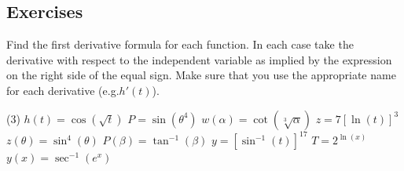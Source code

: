 \documentclass[12pt,]{book}
\theoremstyle{plain}
\theoremstyle{definition}
\numberwithin{equation}{section}
\newcounter{figstack}
\newcounter{figindex}
\newlength\fight
\newcommand\pushValignCaptionBottom[5][b]{%
\stepcounter{figstack}%
\expandafter\def\csname %
figalign\romannumeral\value{figstack}\endcsname{#1}%
\expandafter\def\csname %
figtype\romannumeral\value{figstack}\endcsname{#2}%
\expandafter\def\csname %
figwd\romannumeral\value{figstack}\endcsname{#3}%
\expandafter\def\csname %
figcontent\romannumeral\value{figstack}\endcsname{#4}%
\expandafter\def\csname %
figcap\romannumeral\value{figstack}\endcsname{#5}%
\setbox0=\hbox{%
\begin{#2}{#3}#4\end{#2}}%
\ifdim\dimexpr\ht0+\dp0\relax>\fight\global\setlength{\fight}{%
\dimexpr\ht0+\dp0\relax}\fi%
}
\newcommand\popValignCaptionBottom{%
\setcounter{figindex}{0}%
\hfill%
\whiledo{\value{figindex}<\value{figstack}}{%
\stepcounter{figindex}%
\def\tmp{\csname figwd\romannumeral\value{figindex}\endcsname}%
\begin{\csname figtype\romannumeral\value{figindex}\endcsname}[t]{\tmp}%
\centering%
\stackinset{c}{}%
{\csname figalign\romannumeral\value{figindex}\endcsname}{}%
{\csname figcontent\romannumeral\value{figindex}\endcsname}%
{\rule{0pt}{\fight}}\par%
\csname figcap\romannumeral\value{figindex}\endcsname%
\end{\csname figtype\romannumeral\value{figindex}\endcsname}%
\hfill%
}%
\setcounter{figstack}{0}%
\setlength{\fight}{0pt}%
\hfill%
}
\newcommand{\fe}[2]{#1\mathopen{}\left(#2\right)\mathclose{}}
\newcommand{\fd}[1]{#1'}
\begin{document}
\subsection[Exercises]{Exercises}\label{exercises-43}
\hypertarget{exercisegroup-92}{\null}Find the first derivative formula for each function.  In each case take the derivative with respect to the independent variable as implied by the expression on the right side of the equal sign.  Make sure that you use the appropriate name for each derivative (e.g.\@ \(\fe{\fd{h}}{t}\)).%
\par
\begin{exercisegroup}(3)
\exercise[1.]\hypertarget{exercise-441}{\null}\(\fe{h}{t}=\fe{\cos}{\sqrt{t}}\)%
\exercise[2.]\hypertarget{exercise-442}{\null}\(P=\fe{\sin}{\theta^4}\)%
\exercise[3.]\hypertarget{exercise-443}{\null}\(\fe{w}{\alpha}=\fe{\cot}{\sqrt[3]{\alpha}}\)%
\exercise[4.]\hypertarget{exercise-444}{\null}\(z=7\left[\fe{\ln}{t}\right]^3\)%
\exercise[5.]\hypertarget{exercise-445}{\null}\(\fe{z}{\theta}=\fe{\sin^4}{\theta}\)%
\exercise[6.]\hypertarget{exercise-446}{\null}\(\fe{P}{\beta}=\fe{\tan^{-1}}{\beta}\)%
\exercise[7.]\hypertarget{exercise-447}{\null}\(y=\left[\fe{\sin^{-1}}{t}\right]^{17}\)%
\exercise[8.]\hypertarget{exercise-448}{\null}\(T=2^{\fe{\ln}{x}}\)%
\exercise[9.]\hypertarget{exercise-449}{\null}\(\fe{y}{x}=\fe{\sec^{-1}}{e^x}\)%
\end{exercisegroup}
\par\smallskip\noindent
\hypertarget{exercisegroup-93}{\null}
\end{document}
